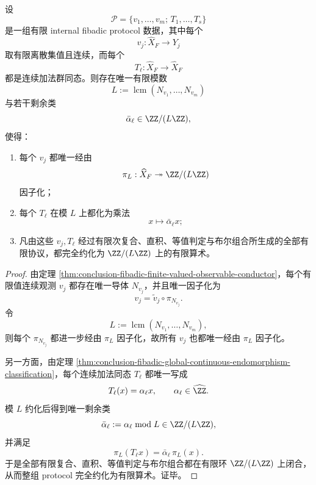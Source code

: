 \begin{theorem}\label{thm:conclusion-fibadic-finite-internal-protocol-finite-arithmetic-reduction}
设
\[
\mathcal P=\{v_1,\dots,v_m;\,T_1,\dots,T_s\}
\]
是一组有限 internal fibadic protocol 数据，其中每个
\[
v_j:\widehat X_F\to Y_j
\]
取有限离散集值且连续，而每个
\[
T_\ell:\widehat X_F\to \widehat X_F
\]
都是连续加法群同态。则存在唯一有限模数
\[
L:=\operatorname{lcm}(N_{v_1},\dots,N_{v_m})
\]
与若干剩余类
\[
\bar\alpha_\ell\in \ZZ/(L\ZZ),
\]
使得：
\begin{enumerate}
\normalfont
  \item 每个 \(v_j\) 都唯一经由
  \[
  \pi_L:\widehat X_F\twoheadrightarrow \ZZ/(L\ZZ)
  \]
  因子化；
  \item 每个 \(T_\ell\) 在模 \(L\) 上都化为乘法
  \[
  x\longmapsto \bar\alpha_\ell x;
  \]
  \item 凡由这些 \(v_j,T_\ell\) 经过有限次复合、直积、等值判定与布尔组合所生成的全部有限协议，都完全约化为 \(\ZZ/(L\ZZ)\) 上的有限算术。
\end{enumerate}
\end{theorem}
\begin{proof}
由定理 \ref{thm:conclusion-fibadic-finite-valued-observable-conductor}，每个有限值连续观测 \(v_j\) 都存在唯一导体 \(N_{v_j}\)，并且唯一因子化为
\[
v_j=\widetilde v_j\circ \pi_{N_{v_j}}.
\]
令
\[
L:=\operatorname{lcm}(N_{v_1},\dots,N_{v_m}),
\]
则每个 \(\pi_{N_{v_j}}\) 都进一步经由 \(\pi_L\) 因子化，故所有 \(v_j\) 也都唯一经由 \(\pi_L\) 因子化。

另一方面，由定理 \ref{thm:conclusion-fibadic-global-continuous-endomorphism-classification}，每个连续加法同态 \(T_\ell\) 都唯一写成
\[
T_\ell(x)=\alpha_\ell x,
\qquad
\alpha_\ell\in \widehat{\ZZ}.
\]
模 \(L\) 约化后得到唯一剩余类
\[
\bar\alpha_\ell:=\alpha_\ell\bmod L\in \ZZ/(L\ZZ),
\]
并满足
\[
\pi_L(T_\ell x)=\bar\alpha_\ell\,\pi_L(x).
\]
于是全部有限复合、直积、等值判定与布尔组合都在有限环 \(\ZZ/(L\ZZ)\) 上闭合，从而整组 protocol 完全约化为有限算术。证毕。
\end{proof}

